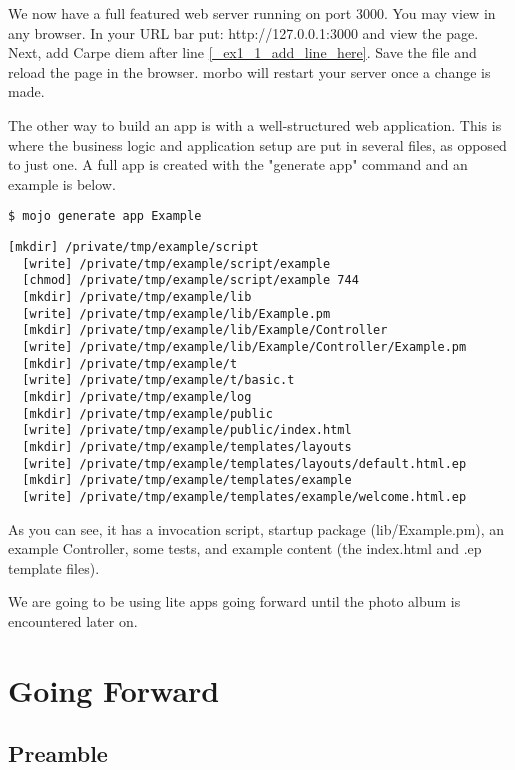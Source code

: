 \documentclass[14pt]{extreport}
\begin{document}
We now have a full featured web server running on port 3000. You may view in
any browser. In your URL bar put: http://127.0.0.1:3000 and view the page.
Next, add Carpe diem after line \ref{_ex1_1_add_line_here}. Save the file and reload
the page in the browser. morbo will restart your server once a change is made.

The other way to build an app is with a well-structured web application. This
is where the business logic and application setup are put in several files, as
opposed to just one.  A full app is created with the "generate app" command and
an example is below.

\begin{lstlisting}[style=BashInputStyle]
$ mojo generate app Example           
\end{lstlisting}

\begin{lstlisting}[style=BashOutputStyle]
  [mkdir] /private/tmp/example/script
  [write] /private/tmp/example/script/example
  [chmod] /private/tmp/example/script/example 744
  [mkdir] /private/tmp/example/lib
  [write] /private/tmp/example/lib/Example.pm
  [mkdir] /private/tmp/example/lib/Example/Controller
  [write] /private/tmp/example/lib/Example/Controller/Example.pm
  [mkdir] /private/tmp/example/t
  [write] /private/tmp/example/t/basic.t
  [mkdir] /private/tmp/example/log
  [mkdir] /private/tmp/example/public
  [write] /private/tmp/example/public/index.html
  [mkdir] /private/tmp/example/templates/layouts
  [write] /private/tmp/example/templates/layouts/default.html.ep
  [mkdir] /private/tmp/example/templates/example
  [write] /private/tmp/example/templates/example/welcome.html.ep
\end{lstlisting}

As you can see, it has a invocation script, startup package (lib/Example.pm),
an example Controller, some tests, and example content (the index.html and .ep
template files).

We are going to be using lite apps going forward until the photo album is
encountered later on.

\chapter*{Going Forward}

\section{Preamble}
\end{document}
